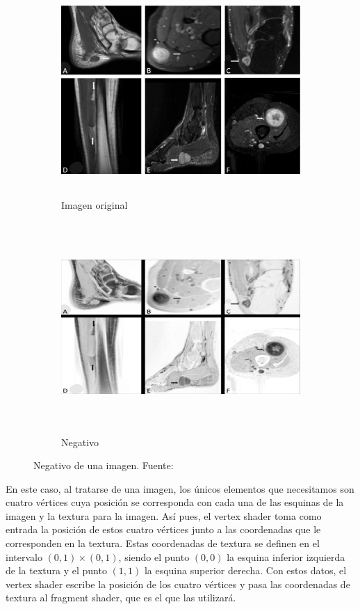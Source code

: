 \begin{figure}[h]
	\centering	
	\begin{subfigure}{0.45\textwidth}
		\includegraphics[height=8cm,width=\textwidth]{figures/mynegative00.jpg}
		\caption{Imagen original}
	\end{subfigure}
	\hfill
	\begin{subfigure}{0.45\textwidth}
		\includegraphics[height=8cm,width=\textwidth]{figures/mynegative01.png}
		\caption{Negativo}
	\end{subfigure}
	\caption[Negativo de una imagen.]{Negativo de una imagen.
	Fuente:~\cite{negativeimage}}
	\label{fig:mynegative}
\end{figure}

En este caso, al tratarse de una imagen, los únicos elementos que necesitamos
son cuatro vértices cuya posición se corresponda con cada una de las esquinas de
la imagen y la textura para la imagen. Así pues, el vertex shader toma como
entrada la posición de estos cuatro vértices junto a las coordenadas que le
corresponden en la textura. Estas coordenadas de textura se definen en el
intervalo $(0,1)\times(0,1)$, siendo el punto $(0,0)$ la esquina inferior
izquierda de la textura y el punto $(1,1)$ la esquina superior derecha. Con
estos datos, el vertex shader escribe la posición de los cuatro vértices y pasa
las coordenadas de textura al fragment shader, que es el que las utilizará. 

